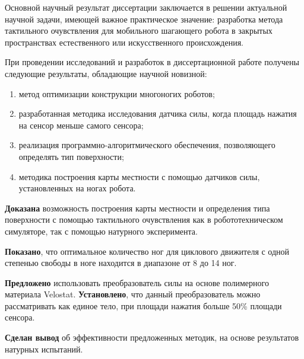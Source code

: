 
Основной  научный  результат  диссертации  заключается  в  решении  актуальной 
научной  задачи,  имеющей  важное  практическое  значение: разработка метода тактильного очувствления для мобильного шагающего робота в закрытых пространствах естественного или искусственного происхождения. 

При  проведении  исследований  и  разработок  в  диссертационной  работе  получены 
следующие результаты, обладающие научной новизной:
\begin{enumerate}
  \item метод оптимизации конструкции многоногих роботов;
  \item разработанная методика исследования датчика силы, когда площадь нажатия на сенсор меньше самого сенсора;
  \item реализация программно-алгоритмического обеспечения, позволяющего определять тип поверхности;
  \item методика построения карты местности с помощью датчиков силы, установленных на ногах робота.
\end{enumerate}

\textbf{Доказана} возможность построения карты местности и определения типа поверхности с помощью тактильного очувствления как в робототехническом симуляторе, так с помощью натурного эксперимента.

\textbf{Показано}, что оптимальное количество ног для циклового движителя с одной степенью свободы в ноге находится в диапазоне от 8 до 14 ног. 

\textbf{Предложено} использовать преобразователь силы на основе полимерного материала Velostat. \textbf{Установлено}, что данный преобразователь можно рассматривать как единое тело, при площади нажатия больше 50\% площади сенсора. 

\textbf{Сделан вывод} об эффективности предложенных методик, на основе результатов натурных испытаний.